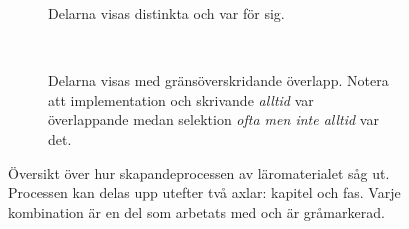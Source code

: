 \begin{binge}
\begin{figure}[tph]
    \centering
    \begin{subfigure}[t]{0.5\textwidth}
        \centering
        \caption{Delarna visas distinkta och var för sig.}
        \label{fig:oversiktA}
    \end{subfigure}%
    ~ 
    \begin{subfigure}[t]{0.5\textwidth}
        \centering
        \caption{Delarna visas med gränsöverskridande överlapp. Notera att implementation och skrivande \textit{alltid} var överlappande medan selektion \textit{ofta men inte alltid} var det.}
        \label{fig:oversiktB}
    \end{subfigure}
    \caption{Översikt över hur skapandeprocessen av läromaterialet såg ut. Processen kan delas upp utefter två axlar: kapitel och fas. Varje kombination är en del som arbetats med och är gråmarkerad.}
\end{figure}


\end{binge}
